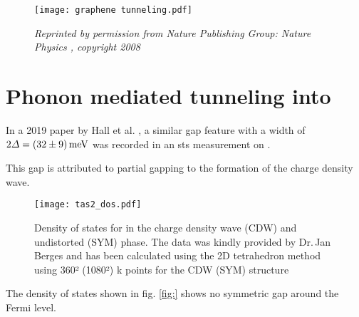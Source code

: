 \documentclass[main.tex]{subfiles}
\begin{document}
\begin{figure}[htb!]
    \texttt{[image: graphene tunneling.pdf]}
    \caption{\emph{Reprinted by permission from Nature Publishing Group: Nature Physics \cite{zhang_giant_2008}, copyright 2008}}
\end{figure}

\section{Phonon mediated tunneling into \TaS}

In a 2019 paper by Hall et al. \cite{hall_environmental_2019}, a similar gap feature with a width of \(2 \Delta = \SI[separate-uncertainty = true]{32 \pm 9}{\milli\eV}\) was recorded in an \acrshort{sts} measurement on \TaS.

This gap is attributed to partial gapping to the formation of the charge density wave.

\begin{figure}[htb!]
    \centering
    \texttt{[image: tas2\_dos.pdf]}
    \caption{Density of states for \TaS in the charge density wave (CDW) and undistorted (SYM) phase. The data was kindly provided by Dr.\,Jan Berges and has been calculated using the 2D tetrahedron method using 360² (1080²) k points for the CDW (SYM) structure}
    \label{fig:tas2_dos}
\end{figure}
The density of states shown in fig. \ref{fig:} shows no symmetric gap around the Fermi level.
\end{document}

